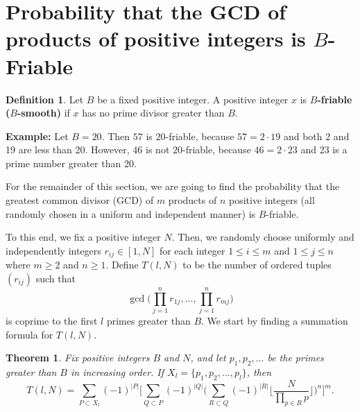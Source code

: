 \documentclass[10pt,a4paper]{article}
\newtheorem{theorem}{Theorem}[section]
\theoremstyle{definition}
\newtheorem{definition}{Definition}[section]
\theoremstyle{remark}
\begin{document}
\section{Probability that the GCD of products of positive integers is  \texorpdfstring{\(B\)}{}-Friable}

\begin{definition} Let $B$ be a fixed positive integer. A positive integer $x$ is \textbf{$B$-friable ($B$-smooth)} if $x$ has no prime divisor greater than $B$. 
\end{definition}

\noindent \textbf{Example:} Let $B = 20$. Then $57$ is $20$-friable, because $57 = 2 \cdot 19$ and both 2 and 19 are less than 20. However, $46$ is not $20$-friable, because $46= 2 \cdot 23$ and 23 is a prime number greater than 20.

\vspace{.1 in}

For the remainder of this section, we are going to find the probability that the greatest common divisor (GCD) of $m$ products of $n$ positive integers (all randomly chosen in a uniform and independent manner) is $B$-friable.

\vspace{.1 in}

To this end, we fix a positive integer $N$. Then, we randomly choose uniformly and independently integers $r_{ij} \in [1, N]$ for each integer $1 \leq i \leq m$ and $1 \leq j \leq n$ where $m \geq 2$ and $n \geq 1$. Define $T(l,N)$ to be the number of ordered tuples $(r_{ij})$ such that 
$$\gcd\Big(\prod_{j=1}^nr_{1j}, ..., \prod_{j=1}^n r_{mj}\Big)$$
is coprime to the first $l$ primes greater than $B$. We start by finding a summation formula for $T(l,N)$.

\begin{theorem}
Fix positive integers $B$ and $N$, and let $p_1, p_2, ...$ be the primes greater than $B$ in increasing order. If $X_l = \{p_1, p_2, ..., p_l\}$, then
$$T(l,N)=\sum_{P\subset X_l}{(-1)^{|P|}} \Bigg[\sum_{Q\subset P}(-1)^{|Q|} \Big(\sum_{R\subset Q}(-1)^{|R|}\Big\lfloor\frac{N}{\prod_{p\in R} p}\Big\rfloor\Big)^n\Bigg]^m.$$
\end{theorem}
\end{document}
